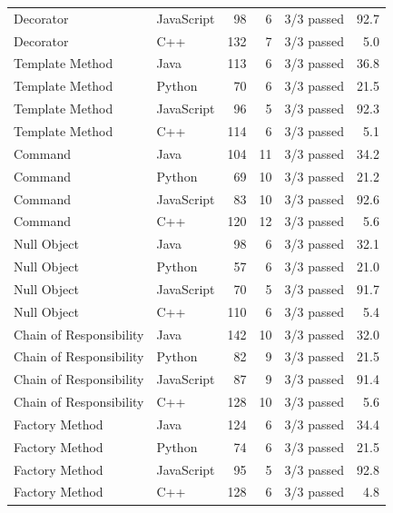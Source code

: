 \documentclass[11pt,a4paper]{article}
\begin{document}
\begin{longtable}{@{}llrrlr@{}}
Decorator & JavaScript & 98 & 6 & 3/3 passed & 92.7\\
Decorator & C++ & 132 & 7 & 3/3 passed & 5.0\\
Template Method & Java & 113 & 6 & 3/3 passed & 36.8\\
Template Method & Python & 70 & 6 & 3/3 passed & 21.5\\
Template Method & JavaScript & 96 & 5 & 3/3 passed & 92.3\\
Template Method & C++ & 114 & 6 & 3/3 passed & 5.1\\
Command & Java & 104 & 11 & 3/3 passed & 34.2\\
Command & Python & 69 & 10 & 3/3 passed & 21.2\\
Command & JavaScript & 83 & 10 & 3/3 passed & 92.6\\
Command & C++ & 120 & 12 & 3/3 passed & 5.6\\
Null Object & Java & 98 & 6 & 3/3 passed & 32.1\\
Null Object & Python & 57 & 6 & 3/3 passed & 21.0\\
Null Object & JavaScript & 70 & 5 & 3/3 passed & 91.7\\
Null Object & C++ & 110 & 6 & 3/3 passed & 5.4\\
Chain of Responsibility & Java & 142 & 10 & 3/3 passed & 32.0\\
Chain of Responsibility & Python & 82 & 9 & 3/3 passed & 21.5\\
Chain of Responsibility & JavaScript & 87 & 9 & 3/3 passed & 91.4\\
Chain of Responsibility & C++ & 128 & 10 & 3/3 passed & 5.6\\
Factory Method & Java & 124 & 6 & 3/3 passed & 34.4\\
Factory Method & Python & 74 & 6 & 3/3 passed & 21.5\\
Factory Method & JavaScript & 95 & 5 & 3/3 passed & 92.8\\
Factory Method & C++ & 128 & 6 & 3/3 passed & 4.8\\
\bottomrule\end{longtable}
\end{document}
